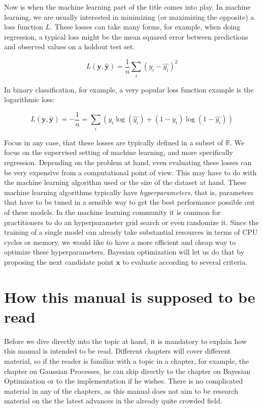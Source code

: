 \documentclass[10pt,a4paper,twoside]{book}
\begin{document}
Now is when the machine learning part of the title comes into play. In machine learning, we are usually interested in minimizing (or maximizing the opposite) a loss function $L$. These losses can take many forms, for example, when doing regression, a typical loss might be the mean squared error between predictions and observed values on a holdout test set.

\begin{equation}
L(\boldsymbol{y}, \boldsymbol{\hat{y}}) = \dfrac{1}{n} \sum_i \left(y_i - \hat{y_i}\right)^2
\end{equation}

In binary classification, for example, a very popular loss function example is the logarithmic loss:

\begin{equation}
L(\boldsymbol{y}, \boldsymbol{\hat{y}}) = -\dfrac{1}{n} = \sum_i \left(y_i \log(\hat{y_i}) + (1 - y_i)\log(1-\hat{y_i})\right)
\end{equation}

Focus in any case, that these losses are typically defined in a subset of $\mathbb{R}$. We focus on the supervised setting of machine learning, and more specifically regression. Depending on the problem at hand, even evaluating these losses can be very expensive from a computational point of view. This may have to do with the machine learning algorithm used or the size of the dataset at hand. These machine learning algorithms typically have \textit{hyperparameters}, that is, parameters that have to be tuned in a sensible way to get the best performance possible out of these models. In the machine learning community it is common for practitioners to do an hyperparameter grid search or even randomize it. Since the training of a single model can already take substantial resources in terms of CPU cycles or memory, we would like to have a more efficient and cheap way to optimize these hyperparameters. Bayesian optimization will let us do that by proposing the next candidate point $\boldsymbol{x}$ to evaluate according to several criteria.

\section{How this manual is supposed to be read}

Before we dive directly into the topic at hand, it is mandatory to explain how this manual is intended to be read. Different chapters will cover different material, so if the reader is familiar with a topic in a chapter, for example, the chapter on Gaussian Processes, he can skip directly to the chapter on Bayesian Optimization or to the implementation if he wishes. There is no complicated material in any of the chapters, as this manual does not aim to be research material on the the latest advances in the already quite crowded field.\\
\end{document}
